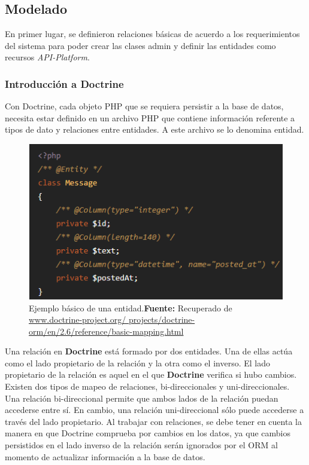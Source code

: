 
\subsection{Modelado}%
\label{sub:modelado}
En primer lugar, se definieron relaciones básicas de acuerdo a los requerimientos del sistema para poder crear las clases admin y definir las entidades como
recursos \textit{API-Platform}.

\subsubsection{Introducción a Doctrine}%
\label{ssub:introducción_doctrine}
Con Doctrine, cada objeto PHP que se requiera persistir a la base de datos, necesita estar definido en un archivo PHP que
contiene información referente a tipos de dato y relaciones entre entidades. A este archivo se lo denomina entidad.

\begin{figure}[H]
    \includegraphics[width=1\linewidth]{image/entidad-doctrine.png}
    \caption[Ejemplo básico de una entidad]{Ejemplo básico de una entidad.\newline \textbf{Fuente:} Recuperado de \url{www.doctrine-project.org/
    projects/doctrine-orm/en/2.6/reference/basic-mapping.html}}%
    \label{fig:image/entidad-doctrine}
\end{figure}
Una relación en \textbf{Doctrine} está formado por dos entidades. Una de ellas actúa como el lado propietario de la relación y la otra como el inverso\@.
El lado propietario de la relación es aquel en el que \textbf{Doctrine} verifica si hubo cambios.
Existen dos tipos de mapeo de relaciones, bi-direccionales y uni-direccionales\@.
Una relación bi-direccional permite que ambos lados de la relación puedan accederse entre sí\@. En cambio, una relación uni-direccional sólo puede accederse
a través del lado propietario\@.
Al trabajar con relaciones, se debe tener en cuenta la manera en que Doctrine comprueba por cambios en los datos, ya que cambios persistidos en el lado
inverso de la relación serán ignorados por el ORM al momento de actualizar información a la base de datos.



